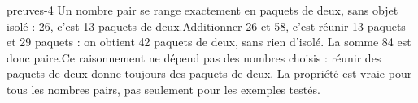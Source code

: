 \begin{blocEdition}{preuves-4}
Un nombre pair se range exactement en paquets de deux, sans objet isolé : 26, c’est 13 paquets de deux.Additionner 26 et 58, c’est réunir 13 paquets et 29 paquets : on obtient 42 paquets de deux, sans rien d’isolé. La somme 84 est donc paire.Ce raisonnement ne dépend pas des nombres choisis : réunir des paquets de deux donne toujours des paquets de deux. La propriété est vraie pour tous les nombres pairs, pas seulement pour les exemples testés.
\end{blocEdition}
